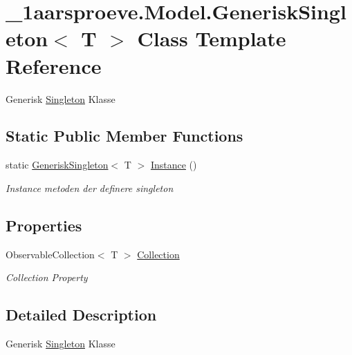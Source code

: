\hypertarget{class__1aarsproeve_1_1_model_1_1_generisk_singleton}{}\section{\+\_\+1aarsproeve.\+Model.\+Generisk\+Singleton$<$ T $>$ Class Template Reference}
\label{class__1aarsproeve_1_1_model_1_1_generisk_singleton}


Generisk \hyperlink{class__1aarsproeve_1_1_model_1_1_singleton}{Singleton} Klasse  


\subsection*{Static Public Member Functions}
\begin{DoxyCompactItemize}
\item 
static \hyperlink{class__1aarsproeve_1_1_model_1_1_generisk_singleton}{Generisk\+Singleton}$<$ T $>$ \hyperlink{class__1aarsproeve_1_1_model_1_1_generisk_singleton_a68d5e62e7d199df6c63011a4ac6e43b6}{Instance} ()
\begin{DoxyCompactList}\small\item\em Instance metoden der definere singleton \end{DoxyCompactList}\end{DoxyCompactItemize}
\subsection*{Properties}
\begin{DoxyCompactItemize}
\item 
Observable\+Collection$<$ T $>$ \hyperlink{class__1aarsproeve_1_1_model_1_1_generisk_singleton_a350a2fb273daada34ad4fab80105b543}{Collection}
\begin{DoxyCompactList}\small\item\em Collection Property \end{DoxyCompactList}\end{DoxyCompactItemize}


\subsection{Detailed Description}
Generisk \hyperlink{class__1aarsproeve_1_1_model_1_1_singleton}{Singleton} Klasse 


